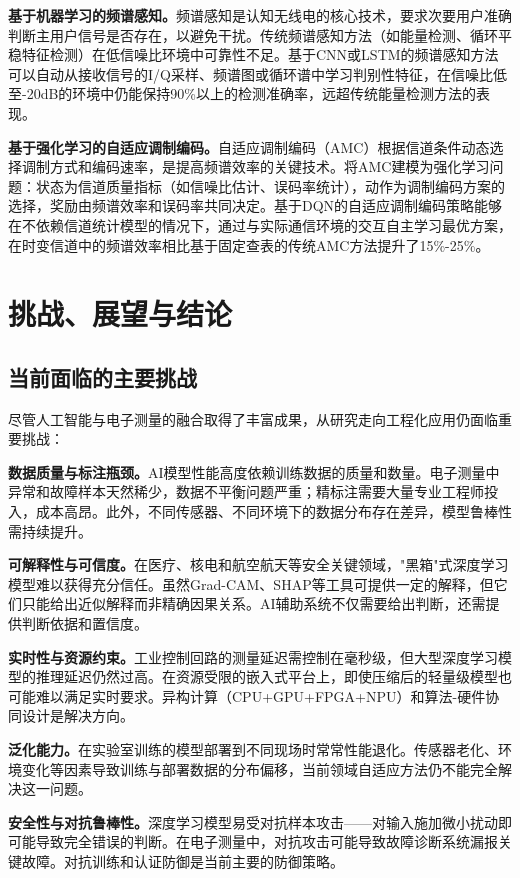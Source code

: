 \documentclass[12pt,a4paper]{article}
\numberwithin{figure}{section}
\numberwithin{table}{section}
\numberwithin{equation}{section}
\begin{document}
\textbf{基于机器学习的频谱感知。}频谱感知是认知无线电的核心技术，要求次要用户准确判断主用户信号是否存在，以避免干扰。传统频谱感知方法（如能量检测、循环平稳特征检测）在低信噪比环境中可靠性不足。基于CNN或LSTM的频谱感知方法可以自动从接收信号的I/Q采样、频谱图或循环谱中学习判别性特征，在信噪比低至-20dB的环境中仍能保持90\%以上的检测准确率，远超传统能量检测方法的表现。

\textbf{基于强化学习的自适应调制编码。}自适应调制编码（AMC）根据信道条件动态选择调制方式和编码速率，是提高频谱效率的关键技术。将AMC建模为强化学习问题：状态为信道质量指标（如信噪比估计、误码率统计），动作为调制编码方案的选择，奖励由频谱效率和误码率共同决定。基于DQN的自适应调制编码策略能够在不依赖信道统计模型的情况下，通过与实际通信环境的交互自主学习最优方案，在时变信道中的频谱效率相比基于固定查表的传统AMC方法提升了15\%-25\%。

\newpage

\section{挑战、展望与结论}

\subsection{当前面临的主要挑战}

尽管人工智能与电子测量的融合取得了丰富成果，从研究走向工程化应用仍面临重要挑战：

\textbf{数据质量与标注瓶颈。}AI模型性能高度依赖训练数据的质量和数量。电子测量中异常和故障样本天然稀少，数据不平衡问题严重；精标注需要大量专业工程师投入，成本高昂。此外，不同传感器、不同环境下的数据分布存在差异，模型鲁棒性需持续提升。

\textbf{可解释性与可信度。}在医疗、核电和航空航天等安全关键领域，"黑箱"式深度学习模型难以获得充分信任。虽然Grad-CAM、SHAP等工具可提供一定的解释，但它们只能给出近似解释而非精确因果关系。AI辅助系统不仅需要给出判断，还需提供判断依据和置信度。

\textbf{实时性与资源约束。}工业控制回路的测量延迟需控制在毫秒级，但大型深度学习模型的推理延迟仍然过高。在资源受限的嵌入式平台上，即使压缩后的轻量级模型也可能难以满足实时要求。异构计算（CPU+GPU+FPGA+NPU）和算法-硬件协同设计是解决方向。

\textbf{泛化能力。}在实验室训练的模型部署到不同现场时常常性能退化。传感器老化、环境变化等因素导致训练与部署数据的分布偏移，当前领域自适应方法仍不能完全解决这一问题。

\textbf{安全性与对抗鲁棒性。}深度学习模型易受对抗样本攻击——对输入施加微小扰动即可能导致完全错误的判断。在电子测量中，对抗攻击可能导致故障诊断系统漏报关键故障。对抗训练和认证防御是当前主要的防御策略。
\end{document}
